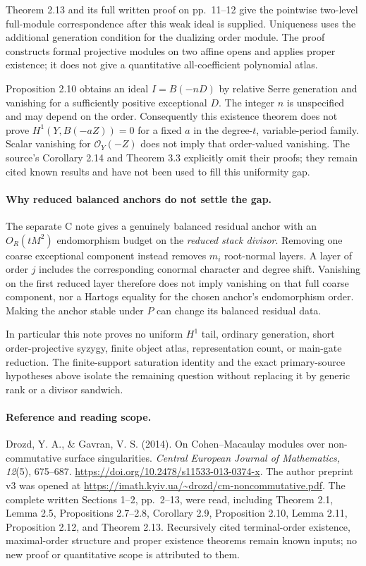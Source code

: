 Theorem 2.13 and its full written proof on pp.~11--12 give the
pointwise two-level full-module correspondence after this
weak ideal is supplied. Uniqueness uses the additional
generation condition for the dualizing order module. The
proof constructs formal projective modules on two affine
opens and applies proper existence; it does not give a
quantitative all-coefficient polynomial atlas.

Proposition 2.10 obtains an ideal $I=B(-nD)$ by relative
Serre generation and vanishing for a sufficiently positive
exceptional $D$. The integer $n$ is unspecified and may
depend on the order. Consequently this existence theorem
does not prove $H^1(Y,B(-aZ))=0$ for a fixed $a$ in the
degree-$t$, variable-period family. Scalar vanishing for
$\mathcal O_Y(-Z)$ does not imply that order-valued vanishing.
The source's Corollary 2.14 and Theorem 3.3 explicitly omit
their proofs; they remain cited known results and have not
been used to fill this uniformity gap.

\paragraph{Why reduced balanced anchors do not settle the gap.}
The separate C note gives a genuinely balanced residual
anchor with an $O_R(tM^2)$ endomorphism budget on the
\emph{reduced stack divisor}. Removing one coarse exceptional
component instead removes $m_i$ root-normal layers. A layer
of order $j$ includes the corresponding conormal character
and degree shift. Vanishing on the first reduced layer
therefore does not imply vanishing on that full coarse
component, nor a Hartogs equality for the chosen anchor's
endomorphism order. Making the anchor stable under $P$
can change its balanced residual data.

In particular this note proves no uniform $H^1$ tail,
ordinary generation, short order-projective syzygy, finite
object atlas, representation count, or main-gate reduction.
The finite-support saturation identity and the exact
primary-source hypotheses above isolate the remaining
question without replacing it by generic rank or a divisor
sandwich.

\paragraph{Reference and reading scope.}
Drozd, Y. A., \& Gavran, V. S. (2014).
On Cohen--Macaulay modules over non-commutative surface
singularities. \emph{Central European Journal of Mathematics,
12}(5), 675--687.
\url{https://doi.org/10.2478/s11533-013-0374-x}.
The author preprint v3 was opened at
\url{https://imath.kyiv.ua/~drozd/cm-noncommutative.pdf}.
The complete written Sections 1--2, pp.~2--13, were read,
including Theorem 2.1, Lemma 2.5, Propositions 2.7--2.8,
Corollary 2.9, Proposition 2.10, Lemma 2.11,
Proposition 2.12, and Theorem 2.13. Recursively cited
terminal-order existence, maximal-order structure and
proper existence theorems remain known inputs; no new
proof or quantitative scope is attributed to them.
